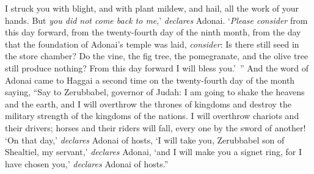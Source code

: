 \begin{biblechapter}
\verse I struck you with blight, and with plant mildew, and hail, all the work of your hands. But \textit{you did not come back to me},’ \textit{declares} Adonai.
\verse ‘\textit{Please consider} from this day forward, from the twenty-fourth day of the ninth month, from the day that the foundation of Adonai’s temple was laid, \textit{consider}:
\verse Is there still seed in the store chamber? Do the vine, the fig tree, the pomegranate, and the olive tree still produce nothing? From this day forward I will bless you.’ ”
 And the word of Adonai came to Haggai a second time on the twenty-fourth day of the month saying,
\verse “Say to Zerubbabel, governor of Judah: I am going to shake the heavens and the earth,
\verse and I will overthrow the thrones of kingdoms and destroy the military strength of the kingdoms of the nations. I will overthrow chariots and their drivers; horses and their riders will fall, every one by the sword of another!
\verse ‘On that day,’ \textit{declares} Adonai of hosts, ‘I will take you, Zerubbabel son of Shealtiel, my servant,’ \textit{declares} Adonai, ‘and I will make you a signet ring, for I have chosen you,’ \textit{declares} Adonai of hosts.”
\end{biblechapter}

